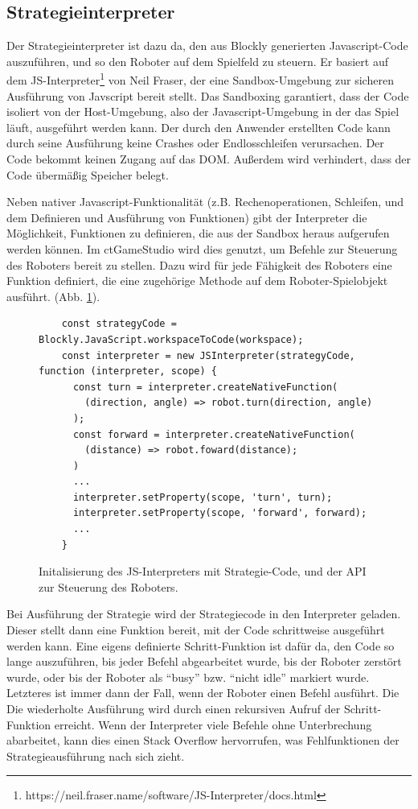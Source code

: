\subsection{Strategieinterpreter}

Der Strategieinterpreter ist dazu da, den aus Blockly generierten Javascript-Code auszuführen, und
so den Roboter auf dem Spielfeld zu steuern. Er basiert auf dem
JS-Interpreter\footnote{https://neil.fraser.name/software/JS-Interpreter/docs.html} von Neil Fraser,
der eine Sandbox-Umgebung zur sicheren Ausführung von Javscript bereit stellt. Das Sandboxing
garantiert, dass der Code isoliert von der Host-Umgebung, also der Javascript-Umgebung in der das
Spiel läuft, ausgeführt werden kann. Der durch den Anwender erstellten Code kann durch seine
Ausführung keine Crashes oder Endlosschleifen verursachen. Der Code bekommt keinen Zugang auf das
DOM. Außerdem wird verhindert, dass der Code übermäßig Speicher belegt.

Neben nativer Javascript-Funktionalität (z.B. Rechenoperationen, Schleifen, und dem Definieren und
Ausführung von Funktionen) gibt der Interpreter die Möglichkeit, Funktionen zu definieren, die aus
der Sandbox heraus aufgerufen werden können. Im ctGameStudio wird dies genutzt, um Befehle zur
Steuerung des Roboters bereit zu stellen. Dazu wird für jede Fähigkeit des Roboters eine Funktion
definiert, die eine zugehörige Methode auf dem Roboter-Spielobjekt ausführt. (Abb.
\ref{js-interpreter-init}).

\begin{figure}
  \label{js-interpreter-init}
  \caption{Initalisierung des JS-Interpreters mit Strategie-Code, und der API zur Steuerung des
  Roboters.}
  \begin{lstlisting}
    const strategyCode = Blockly.JavaScript.workspaceToCode(workspace);
    const interpreter = new JSInterpreter(strategyCode, function (interpreter, scope) {
      const turn = interpreter.createNativeFunction(
        (direction, angle) => robot.turn(direction, angle)
      );
      const forward = interpreter.createNativeFunction(
        (distance) => robot.foward(distance);
      )
      ...
      interpreter.setProperty(scope, 'turn', turn);
      interpreter.setProperty(scope, 'forward', forward);
      ...
    }
  \end{lstlisting}
\end{figure}

Bei Ausführung der Strategie wird der Strategiecode in den Interpreter geladen. Dieser stellt dann
eine Funktion bereit, mit der Code schrittweise ausgeführt werden kann. Eine eigens definierte
Schritt-Funktion ist dafür da, den Code so lange auszuführen, bis jeder Befehl abgearbeitet wurde,
bis der Roboter zerstört wurde, oder bis der Roboter als \enquote{busy} bzw. \enquote{nicht idle}
markiert wurde. Letzteres ist immer dann der Fall, wenn der Roboter einen Befehl ausführt. Die
Die wiederholte Ausführung wird durch einen rekursiven Aufruf der Schritt-Funktion erreicht. Wenn der
Interpreter viele Befehle ohne Unterbrechung abarbeitet, kann dies einen Stack Overflow hervorrufen,
was Fehlfunktionen der Strategieausführung nach sich zieht.

